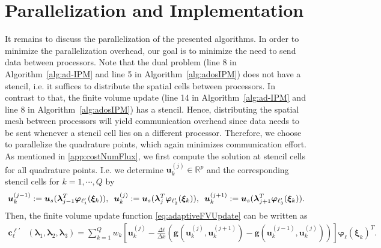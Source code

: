 \section{Parallelization and Implementation}
\label{sec:parallel}
It remains to discuss the parallelization of the presented algorithms. In order to minimize the parallelization overhead, our goal is to minimize the need to send data between processors. Note that the dual problem (line 8 in Algorithm~\ref{alg:ad-IPM} and line 5 in Algorithm~\ref{alg:adosIPM}) does not have a stencil, i.e. it suffices to distribute the spatial cells between processors. In contrast to that, the finite volume update (line 14 in Algorithm~\ref{alg:ad-IPM} and line 8 in Algorithm~\ref{alg:adosIPM}) has a stencil. Hence, distributing the spatial mesh between processors will yield communication overhead since data needs to be sent whenever a stencil cell lies on a different processor. Therefore, we choose to parallelize the quadrature points, which again minimizes communication effort. As mentioned in \ref{app:costNumFlux}, we first compute the solution at stencil cells for all quadrature points. I.e. we determine $\bm u^{(j)}_k\in\mathbb{R}^p$ and the corresponding stencil cells for $k = 1,\cdots,Q$ by
\begin{align*}
\bm u^{(j-1)}_k := \bm u_{s}(\bm{\lambda}_{j-1}^T\bm{\varphi}_{\ell_1'}(\bm \xi_k)), \enskip \bm u^{(j)}_k := \bm u_{s}(\bm{\lambda}_{j}^T\bm{\varphi}_{\ell_2'}(\bm \xi_k)), \enskip \bm u^{(j+1)}_k := \bm u_{s}(\bm{\lambda}_{j+1}^T\bm{\varphi}_{\ell_3'}(\bm \xi_k)).
\end{align*}
Then, the finite volume update function \eqref{eq:adaptiveFVUpdate} can be written as
\begin{align}\label{eq:momentUpQuadrature}
\bm{c}_{\ell}^{\bm{\ell}'}&\left(\bm{\lambda}_{1},\bm{\lambda}_2,\bm{\lambda}_3\right)=\sum_{k=1}^Q w_k \left[\bm u^{(j)}_k- \frac{\Delta t}{\Delta x}\left(\bm g( \bm u^{(j)}_k,\bm u^{(j+1)}_k )- \bm g( \bm u^{(j-1)}_k,\bm u^{(j)}_k )\right)\right]\bm{\varphi}_{\ell}(\bm \xi_k)^T.
\end{align}
